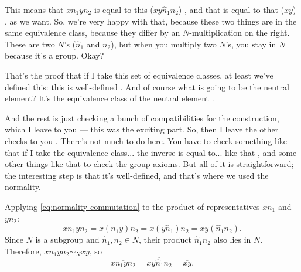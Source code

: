 \begin{proofWrapper}
\begin{speech}[01:04:30 - 01:06:27]
This means that $\overline{x n_1 y n_2}$ is equal to this ($\overline{x y \hat{n}_1 n_2}$) , and that is equal to that ($\overline{xy}$) , as we want. So, we're very happy with that, because these two things are in the same equivalence class, because they differ by an $N$-multiplication on the right. These are two $N$'s ($\hat{n}_1$ and $n_2$), but when you multiply two $N$'s, you stay in $N$ because it's a group. Okay?

That's the proof that if I take this set of equivalence classes, at least we've defined this: this is well-defined . And of course what is going to be the neutral element? It's the equivalence class of the neutral element .

And the rest is just checking a bunch of compatibilities for the construction, which I leave to you --- this was the exciting part. So, then I leave the other checks to you . There's not much to do here. You have to check something like that if I take the equivalence class... the inverse is equal to... like that , and some other things like that to check the group axioms. But all of it is straightforward; the interesting step is that it's well-defined, and that's where we used the normality.
\end{speech}

\begin{content}
Applying \eqref{eq:normality-commutation} to the product of representatives $x n_1$ and $y n_2$:
\[
x n_1 y n_2 = x (n_1 y) n_2 = x (y \hat{n}_1) n_2 = x y (\hat{n}_1 n_2).
\]
Since $N$ is a subgroup and $\hat{n}_1, n_2 \in N$, their product $\hat{n}_1 n_2$ also lies in $N$. Therefore, $x n_1 y n_2 \sim_N x y$, so
\[
\overline{x n_1 y n_2} = \overline{x y \hat{n}_1 n_2} = \overline{xy}.
\]


\end{content}
\end{proofWrapper}
